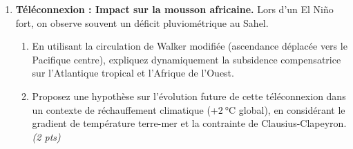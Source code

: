\documentclass[11pt]{article}
\begin{document}
\begin{exercice}
\begin{enumerate}
    \item \textbf{Téléconnexion : Impact sur la mousson africaine.} Lors d'un El Niño fort, on observe souvent un déficit pluviométrique au Sahel.
    \begin{enumerate}
        \item En utilisant la circulation de Walker modifiée (ascendance déplacée vers le Pacifique centre), expliquez dynamiquement la subsidence compensatrice sur l'Atlantique tropical et l'Afrique de l'Ouest.
        \item Proposez une hypothèse sur l'évolution future de cette téléconnexion dans un contexte de réchauffement climatique (+$\SI{2}{\celsius}$ global), en considérant le gradient de température terre-mer et la contrainte de Clausius-Clapeyron. \textit{(2 pts)}
    \end{enumerate}
\end{enumerate}
\end{exercice}
\end{document}
